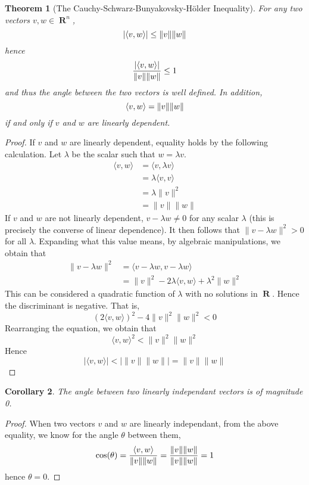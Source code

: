 \documentclass{report}
\newtheorem{theorem}{Theorem}[chapter]
\newtheorem{corollary}[theorem]{Corollary}
\DeclareMathOperator{\real}{\mathbf{R}}
\DeclarePairedDelimiter{\inner}{\langle}{\rangle}
\begin{document}
\begin{theorem}[The Cauchy-Schwarz-Bunyakovsky-H\"{o}lder Inequality]
  For any two vectors $v,w \in \real^n$,
  \[ |\inner{v, w}| \leq \|v\|\|w\| \]
  hence
  \[ \frac{|\inner{v, w}|}{\|v\|\|w\|} \leq 1 \]
  and thus the angle between the two vectors is well defined. In addition,
  \[ \inner{v, w} = \|v\|\|w\| \]
  if and only if $v$ and $w$ are linearly dependent.
\end{theorem}
\begin{proof}
  If $v$ and $w$ are linearly dependent, equality holds by the following calculation. Let $\lambda$ be the scalar such that $w = \lambda v$.
  \begin{align*}
    \langle v, w \rangle &= \langle v, \lambda v \rangle\\
                         &= \lambda \langle v, v \rangle\\
                         &= \lambda \| v \|^2\\
                         &= \| v \| \| w \|
  \end{align*}
  If $v$ and $w$ are not linearly dependent, $v - \lambda w \neq 0$ for any scalar $\lambda$ (this is precisely the converse of linear dependence). It then follows that $\| v - \lambda w \|^2 > 0$ for all $\lambda$. Expanding what this value means, by algebraic manipulations, we obtain that
  \begin{align*}
    \| v - \lambda w \|^2 &= \langle v - \lambda w, v - \lambda w \rangle\\
                          &= \|v\|^2 - 2 \lambda \langle v, w \rangle + \lambda^2 \| w \|^2
  \end{align*}
  This can be considered a quadratic function of $\lambda$ with no solutions in $\real$. Hence the discriminant is negative. That is,
  \[ (2 \langle v, w \rangle)^2 - 4 \|v\|^2 \|w\|^2 < 0 \]
  Rearranging the equation, we obtain that
  \[ \langle v, w \rangle^2 < \|v\|^2\|w\|^2 \]
  Hence
  \[ |\langle v, w \rangle| <|\|v\|\|w\|| = \|v\|\|w\| \]
\end{proof}

\begin{corollary}
  The angle between two linearly independant vectors is of magnitude 0.
\end{corollary}
\begin{proof}
  When two vectors $v$ and $w$ are linearly independant, from the above equality, we know for the angle $\theta$ between them,
  \[\cos(\theta) = \frac{\inner{v, w}}{\|v\|\|w\|} = \frac{\|v\|\|w\|}{\|v\|\|w\|} = 1\]
  hence $\theta = 0$.
\end{proof}
\end{document}
